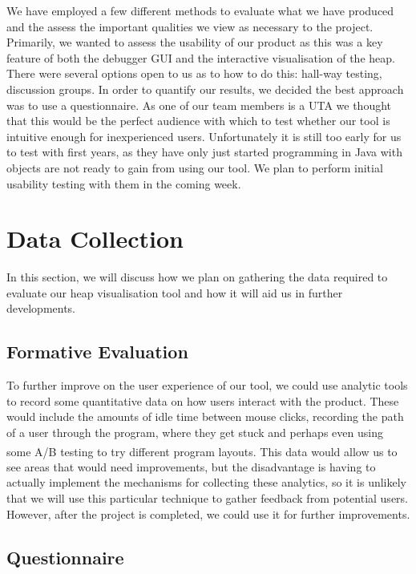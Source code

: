 \documentclass[10pt, a4paper]{article}
\begin{document}
We have employed a few different methods to evaluate what we have produced and the assess the important qualities we view as necessary to the project. Primarily, we wanted to assess the usability of our product as this was a key feature of both the debugger GUI and the interactive visualisation of the heap. There were several options open to us as to how to do this: hall-way testing, discussion groups. In order to quantify our results, we decided the best approach was to use a questionnaire. As one of our team members is a UTA we thought that this would be the perfect audience with which to test whether our tool is intuitive enough for inexperienced users. Unfortunately it is still too early for us to test with first years, as they have only just started programming in Java with objects are not ready to gain from using our tool. We plan to perform initial usability testing with them in the coming week.

\section{Data Collection}
In this section, we will discuss how we plan on gathering the data required to evaluate our heap visualisation tool and how it will aid us in further developments.

\subsection{Formative Evaluation}
To further improve on the user experience of our tool, we could use analytic tools to record some quantitative data on how users interact with the product. These would include the amounts of idle time between mouse clicks, recording the path of a user through the program, where they get stuck and perhaps even using some A/B testing to try different program layouts\textsuperscript{\cite{opt}}. This data would allow us to see areas that would need improvements, but the disadvantage is having to actually implement the mechanisms for collecting these analytics, so it is unlikely that we will use this particular technique to gather feedback from potential users. However, after the project is completed, we could use it for further improvements. 

\subsection{Questionnaire}
\end{document}
